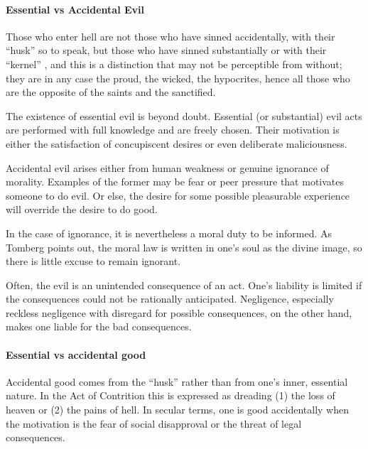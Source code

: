 \paragraph{Essential vs Accidental Evil}


\begin{quotex}
Those who enter hell are not those who have sinned accidentally, with their ``husk'' so to speak, but those who have sinned substantially or with their ``kernel'' , and this is a distinction that may not be perceptible from without; they are in any case the proud, the wicked, the hypocrites, hence all those who are the opposite of the saints and the sanctified.
\end{quotex}


The existence of essential evil is beyond doubt. Essential (or substantial) evil acts are performed with full knowledge and are freely chosen. Their motivation is either the satisfaction of concupiscent desires or even deliberate maliciousness.

Accidental evil arises either from human weakness or genuine ignorance of morality. Examples of the former may be fear or peer pressure that motivates someone to do evil. Or else, the desire for some possible pleasurable experience will override the desire to do good.

In the case of ignorance, it is nevertheless a moral duty to be informed. As Tomberg points out, the moral law is written in one's soul as the divine image, so there is little excuse to remain ignorant.

Often, the evil is an unintended consequence of an act. One's liability is limited if the consequences could not be rationally anticipated. Negligence, especially reckless negligence with disregard for possible consequences, on the other hand, makes one liable for the bad consequences.

\paragraph{Essential vs accidental good}


Accidental good comes from the ``husk'' rather than from one's inner, essential nature. In the Act of Contrition this is expressed as dreading (1) the loss of heaven or (2) the pains of hell. In secular terms, one is good accidentally when the motivation is the fear of social disapproval or the threat of legal consequences.

